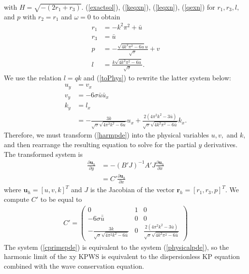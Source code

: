 \documentclass[12pt]{article}
\numberwithin{equation}{section}
\begin{document}
with $H= \sqrt{-(2r_1+r_3)}$. 
(\ref{exactsol}), (\ref{keqxn}), (\ref{leqxn}), (\ref{qexn}) for $r_1, r_3, l,$ and $p$ with $r_2=r_1$ and $\omega=0$ to obtain
\begin{subequations}
\begin{align}
    r_1 &= -k^2\pi^2 + \bar u\\
    r_3&= \bar u\\
    p &= -\frac{\sqrt{4k^2\pi^2-6u}u}{\sqrt{\sigma}} + v \\
    l &= \frac{k\sqrt{4k^2\pi^2-6u}}{\sqrt{\sigma}}. 
\end{align} \label{toPhys}
\end{subequations}
We use the relation $l=qk$ and (\ref{toPhys}) to rewrite the latter system below: \begin{subequations}
\begin{align}
    u_y &= v_x \\
    v_y &= -6\sigma \bar u\bar u_x \\
    k_y &= l_x \\
    &= -\frac{3k}{\sqrt{\sigma}\sqrt{4\pi^2k^2-6u}}u_x + \frac{2(4\pi^2k^2-3 \bar u)}{\sqrt{\sigma}\sqrt{4k^2\pi^2-6 \bar u}}k_x.
\end{align} \label{physicalpde}
\end{subequations}
Therefore, we must transform (\ref{harmpde}) into the physical variables $u,v,$ and $k$, and then rearrange the resulting equation to solve for the partial $y$ derivatives. The transformed system is 
\begin{align}
    \frac{\partial \textbf{u}_h}{\partial y} &= -(B'J)^{-1}A'J\frac{\partial \textbf{u}_h}{\partial x} \\
    &= C'\frac{\partial \textbf{u}_h}{\partial x} \label{cprimepde}
\end{align}
where $\textbf{u}_h=[u,v,k]^T$ and $J$ is the Jacobian of the vector $\textbf{r}_h = [r_1,r_3,p]^T$. We compute $C'$ to be equal to 
\begin{align}
    C' = \left(\begin{array}{ccc}
         0 & 1 & 0  \\
         -6\sigma \bar \bar u& 0 & 0 \\
         -\frac{3k}{\sqrt{\sigma}\sqrt{4\pi^2k^2-6\bar u}} & 0 & \frac{2(4\pi^2k^2-3 \bar u)}{\sqrt{\sigma}\sqrt{4k^2\pi^2-6 \bar u}}
    \end{array}\right)
\end{align}
The system (\ref{cprimepde}) is equivalent to the system (\ref{physicalpde}), so the harmonic limit of the xy KPWS is equivalent to the dispersionless KP equation combined with the wave conservation equation.%
\end{document}
